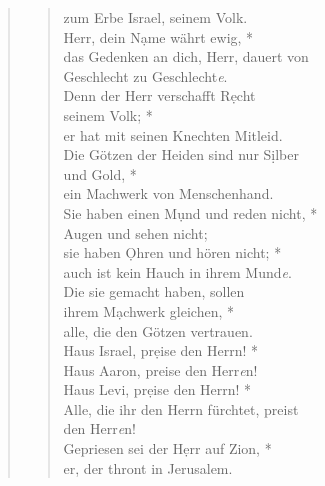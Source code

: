 \begin{quote}
\begin{verse}
\vin zum Erbe Israel, seinem Volk.\\ 
Herr, dein N\d ame währt ewig, *\\ 
das Gedenken an dich, Herr, dauert von \\Geschlecht zu Geschlecht\textit{e}.\\  
\vin Denn der Herr verschafft R\d echt\\ \vin  seinem Volk; *\\ 
\vin er hat mit seinen Knechten Mitleid.\\ 
Die Götzen der Heiden sind nur S\d ilber\\ und Gold, *\\ 
ein Machwerk von Menschenhand.\\  
\vin Sie haben einen M\d und und reden nicht, *\\ 
\vin Augen und sehen nicht;\\ 
sie haben \d Ohren und hören nicht; *\\  
auch ist kein Hauch in ihrem Mund\textit{e}.\\ 
\vin Die sie gemacht haben, sollen \\ \vin  ihrem M\d achwerk gleichen, *\\ 
\vin alle, die den Götzen vertrauen.\\ 
Haus Israel, pr\d eise den Herrn! *\\ 
Haus Aaron, preise den Herr\textit{e}n! \\
\vin Haus Levi, pr\d eise den Herrn! *\\ 
\vin Alle, die ihr den Herrn fürchtet, preist\\ \vin  den Herr\textit{e}n!\\
Gepriesen sei der H\d err auf Zion, *\\ 
er, der thront in Jerusalem.\\  



\end{verse}
\end{quote}


